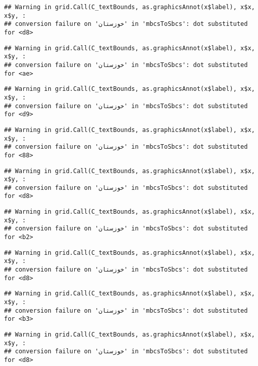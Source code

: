 \documentclass[
]{article}
\begin{document}
\begin{verbatim}
## Warning in grid.Call(C_textBounds, as.graphicsAnnot(x$label), x$x, x$y, :
## conversion failure on 'خوزستان' in 'mbcsToSbcs': dot substituted for <d8>
\end{verbatim}

\begin{verbatim}
## Warning in grid.Call(C_textBounds, as.graphicsAnnot(x$label), x$x, x$y, :
## conversion failure on 'خوزستان' in 'mbcsToSbcs': dot substituted for <ae>
\end{verbatim}

\begin{verbatim}
## Warning in grid.Call(C_textBounds, as.graphicsAnnot(x$label), x$x, x$y, :
## conversion failure on 'خوزستان' in 'mbcsToSbcs': dot substituted for <d9>
\end{verbatim}

\begin{verbatim}
## Warning in grid.Call(C_textBounds, as.graphicsAnnot(x$label), x$x, x$y, :
## conversion failure on 'خوزستان' in 'mbcsToSbcs': dot substituted for <88>
\end{verbatim}

\begin{verbatim}
## Warning in grid.Call(C_textBounds, as.graphicsAnnot(x$label), x$x, x$y, :
## conversion failure on 'خوزستان' in 'mbcsToSbcs': dot substituted for <d8>
\end{verbatim}

\begin{verbatim}
## Warning in grid.Call(C_textBounds, as.graphicsAnnot(x$label), x$x, x$y, :
## conversion failure on 'خوزستان' in 'mbcsToSbcs': dot substituted for <b2>
\end{verbatim}

\begin{verbatim}
## Warning in grid.Call(C_textBounds, as.graphicsAnnot(x$label), x$x, x$y, :
## conversion failure on 'خوزستان' in 'mbcsToSbcs': dot substituted for <d8>
\end{verbatim}

\begin{verbatim}
## Warning in grid.Call(C_textBounds, as.graphicsAnnot(x$label), x$x, x$y, :
## conversion failure on 'خوزستان' in 'mbcsToSbcs': dot substituted for <b3>
\end{verbatim}

\begin{verbatim}
## Warning in grid.Call(C_textBounds, as.graphicsAnnot(x$label), x$x, x$y, :
## conversion failure on 'خوزستان' in 'mbcsToSbcs': dot substituted for <d8>
\end{verbatim}
\end{document}
